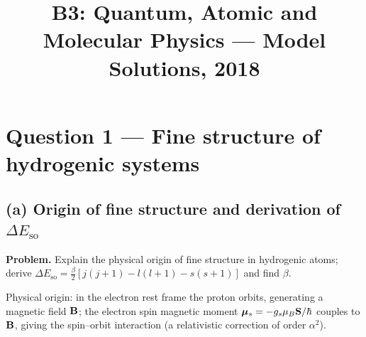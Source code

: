 \documentclass[11pt]{article}
\title{B3: Quantum, Atomic and Molecular Physics --- Model Solutions, 2018}
\author{}
\date{}
\begin{document}
\maketitle

\section*{Question 1 --- Fine structure of hydrogenic systems}

\subsection*{(a) Origin of fine structure and derivation of $\Delta E_\text{so}$}

\textbf{Problem.} Explain the physical origin of fine structure in hydrogenic atoms; derive $\Delta E_\text{so}=\tfrac{\beta}{2}[j(j+1)-l(l+1)-s(s+1)]$ and find $\beta$.

Physical origin: in the electron rest frame the proton orbits, generating a magnetic field $\vb B$; the electron spin magnetic moment $\bm\mu_s=-g_s\mu_B\vb S/\hbar$ couples to $\vb B$, giving the spin--orbit interaction (a relativistic correction of order $\alpha^2$).
\end{document}
